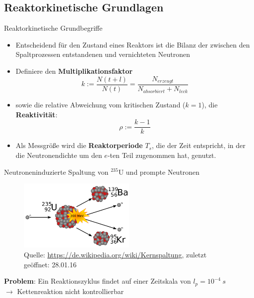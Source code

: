 \documentclass[10pt]{beamer}
\begin{document}
		\subsection{Reaktorkinetische Grundlagen}
				\begin{frame}{Reaktorkinetische Grundbegriffe}
					\begin{itemize}
						\item Entscheidend für den Zustand eines Reaktors ist die Bilanz der zwischen den Spaltprozessen entstandenen und vernichteten Neutronen
						\item Definiere den \textbf{Multiplikationsfaktor}
							\begin{equation*}
								k := \frac{N(t + l)}{N(t)} = \frac{N_{erzeugt}}{N_{absorbiert} + N_{leck}}
							\end{equation*}		
						\item sowie die relative Abweichung vom kritischen Zustand ($k=1$), die \textbf{Reaktivität}:
							\begin{equation*}
								\rho := \frac{k-1}{k}
							\end{equation*}
						\item Als Messgröße wird die \textbf{Reaktorperiode} $T_s$, die der Zeit entspricht, in der die Neutronendichte um den $e$-ten Teil zugenommen hat, genutzt.
					\end{itemize}	
		\end{frame}
		
		\begin{frame}{Neutroneninduzierte Spaltung von $^{235}$U und prompte Neutronen}
			\begin{figure}[ht]
				\centering
				\includegraphics[width=0.5\textwidth]{pic/Kernspaltung}\\
				\tiny{Quelle: \url{https://de.wikipedia.org/wiki/Kernspaltung}, zuletzt geöffnet: 28.01.16}
			\end{figure}
			\textbf{Problem}: Ein Reaktionszyklus findet auf einer Zeitskala von $l_p = 10^{-4}\ \unit{s}$\\
			$\rightarrow$ Kettenreaktion nicht kontrollierbar
		\end{frame}
		
\end{document}
